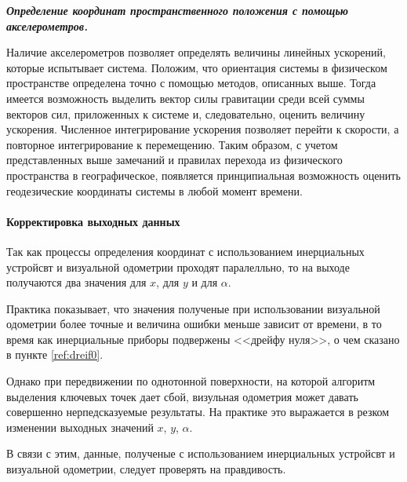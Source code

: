 \textit{\textbf{Определение координат пространственного положения с помощью акселерометров.}}

Наличие акселерометров позволяет определять величины линейных ускорений, которые испытывает система. Положим, что ориентация системы в физическом пространстве определена точно с помощью методов, описанных выше. Тогда имеется возможность выделить вектор силы гравитации среди всей суммы векторов сил, приложенных к системе и, следовательно, оценить величину ускорения. Численное интегрирование ускорения позволяет перейти к скорости, а повторное интегрирование к перемещению. Таким образом, с учетом представленных выше замечаний и правилах перехода из физического пространства в географическое, появляется принципиальная возможность оценить геодезические координаты системы в любой момент времени.

\paragraph{Корректировка выходных данных}
Так как процессы определения координат с использованием инерциальных устройсвт и визуальной одометрии проходят паралелльно, то на выходе получаются два значения для $x$, для $y$ и для $\alpha$.  

Практика показывает, что значения полученые при использовании визуальной одометрии более точные и величина ошибки меньше зависит от времени, в то время как инерциальные приборы подвержены <<дрейфу нуля>>, о чем сказано в пункте \ref{ref:dreif0}.

Однако при передвижении по однотонной поверхности, на которой алгоритм выделения ключевых точек дает сбой, визульная одометрия может давать совершенно нерпедсказуемые результаты. На практике это выражается в резком изменении выходных значений $x$, $y$, $\alpha$. 

В связи с этим, данные, полученые с использованием инерциальных устройсвт и визуальной одометрии, следует проверять на правдивость. 

